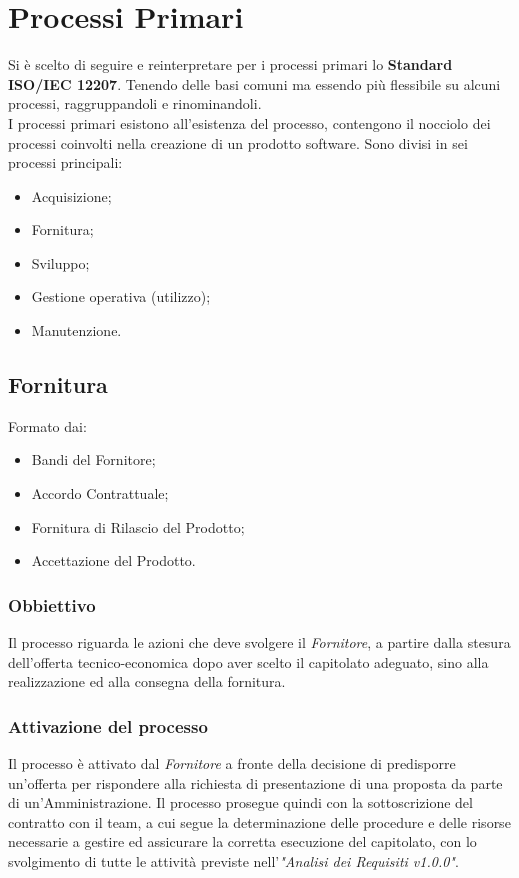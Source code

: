 \documentclass[12pt,a4paper,titlepage]{article}
\begin{document}
\newpage

\section{Processi Primari}
Si è scelto di seguire e reinterpretare per i processi primari lo \textbf{Standard ISO/IEC 12207}. Tenendo delle basi comuni ma essendo più flessibile su alcuni processi, raggruppandoli e rinominandoli.\\
I processi primari esistono all'esistenza del processo, contengono il nocciolo dei processi coinvolti nella creazione di un prodotto software. Sono divisi in sei processi principali:
\begin{itemize}
	\item Acquisizione;
	\item Fornitura;
	\item Sviluppo;
	\item Gestione operativa (utilizzo);
	\item Manutenzione.
\end{itemize}

\subsection{Fornitura}
Formato dai:
\begin{itemize}
	\item Bandi del Fornitore;
	\item Accordo Contrattuale;
	\item Fornitura di Rilascio del Prodotto;
	\item Accettazione del Prodotto.
\end{itemize}

\subsubsection{Obbiettivo}
Il processo riguarda le azioni che deve svolgere il \textit{Fornitore}, a partire dalla stesura dell'offerta tecnico-economica dopo aver scelto il capitolato adeguato, sino alla realizzazione ed alla consegna della fornitura.

\subsubsection{Attivazione del processo}
Il processo è attivato dal \textit{Fornitore} a fronte della decisione di predisporre un'offerta per rispondere alla richiesta di presentazione di una proposta da parte di un'Amministrazione. Il processo prosegue quindi con la sottoscrizione del contratto con il team, a cui segue la determinazione delle procedure e delle risorse necessarie a gestire ed assicurare la corretta esecuzione del capitolato, con lo svolgimento di tutte le attività previste nell'\textit{"Analisi dei Requisiti v1.0.0"}.
\end{document}
